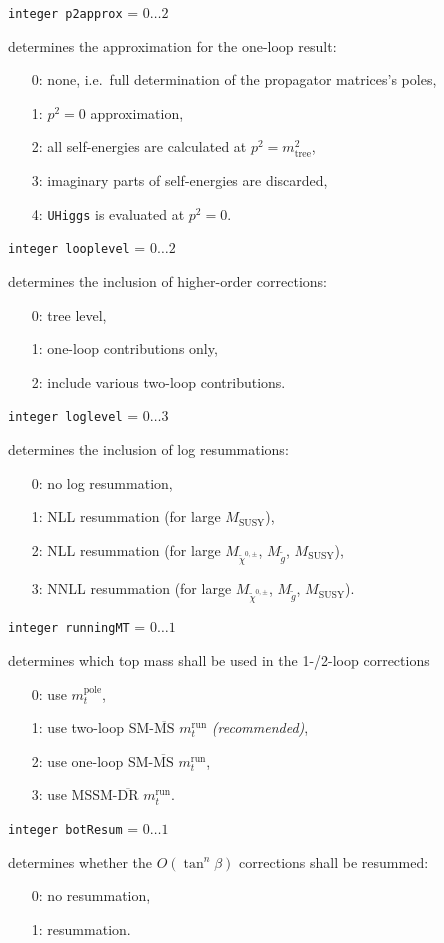\documentclass[12pt,a4paper]{report}
\newcommand{\CODE}[1]{\texttt{#1}}
\newcommand{\FLAGOUT}[3]{%
  \item[\fbox{\scriptsize\textsc{out}}]
  \CODE{#1} = $#2\dots#3$ \par}
\newcommand\ie{i.e.\ }
\begin{document}
\FLAGOUT{integer p2approx}{0}{2}
determines the approximation for the one-loop result:
\begin{itemize}
\item[0:] none, \ie full determination of the propagator matrices's
  poles,
\item[1:] $p^2 = 0$ approximation,
\item[2:] all self-energies are calculated at $p^2 = m_{\text{tree}}^2$,
\item[3:] imaginary parts of self-energies are discarded,
\item[4:] \CODE{UHiggs} is evaluated at $p^2 = 0$.
\end{itemize}

\FLAGOUT{integer looplevel}{0}{2}
determines the inclusion of higher-order corrections:
\begin{itemize}
\item[0:] tree level,
\item[1:] one-loop contributions only,
\item[2:] include various two-loop contributions.
\end{itemize}

\FLAGOUT{integer loglevel}{0}{3}
determines the inclusion of log resummations:
\begin{itemize}
\item[0:] no log resummation,
\item[1:] NLL resummation (for large $M_{\text{SUSY}}$),
\item[2:] NLL resummation (for large $M_{\tilde\chi^{0,\pm}}$,
  $M_{\tilde g}$, $M_{\text{SUSY}}$),
\item[3:] NNLL resummation (for large $M_{\tilde\chi^{0,\pm}}$,
  $M_{\tilde g}$, $M_{\text{SUSY}}$).
\end{itemize}

\FLAGOUT{integer runningMT}{0}{1}
determines which top mass shall be used in the 1-/2-loop corrections
\begin{itemize}
\item[0:] use $m_t^{\text{pole}}$,
\item[1:] use two-loop SM-$\overline{\text{MS}}$ $m_t^{\text{run}}$
  \textit{(recommended)},
\item[2:] use one-loop SM-$\overline{\text{MS}}$ $m_t^{\text{run}}$,
\item[3:] use MSSM-$\overline{\text{DR}}$ $m_t^{\text{run}}$.
\end{itemize}

\FLAGOUT{integer botResum}{0}{1}
determines whether the $O(\tan^n\beta)$ corrections 
shall be resummed:
\begin{itemize}
\item[0:] no resummation,
\item[1:] resummation.
\end{itemize}
\end{document}
